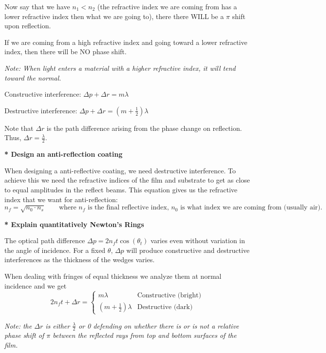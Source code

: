 \documentclass[10pt]{article}
\newcommand*{\lo}[1]{
    \textbf{* #1} \newline
}
\begin{document}
Now say that we have $n_1 < n_2$ (the refractive index we are coming from has a lower refractive index then what we are going to), there there WILL be a $\pi$ shift upon reflection.

\newblock

If we are coming from a high refractive index and going toward a lower refractive index, then there will be NO phase shift.

\newblock

\textit{Note: When light enters a material with a higher refractive index, it will tend toward the normal.}

\newblock

Constructive interference: $\Delta p + \Delta r = m \lambda$

Destructive interference: $\Delta p + \Delta r = (m + \frac{1}{2})\lambda$

Note that $\Delta r$ is the path difference arising from the phase change on reflection. Thus, $\Delta r = \frac{\lambda}{2}$.

\newblock

\lo{Design an anti-reflection coating}

When designing a anti-reflective coating, we need destructive interference. To achieve this we need the refractive indices of the film and substrate to get as close to equal amplitudes in the reflect beams. This equation gives us the refractive index that we want for anti-reflection:
\[n_f = \sqrt{n_0 \cdot n_s} \qquad \text{where $n_f$ is the final reflective index, $n_0$ is what index we are coming from (usually air).}\]


\lo{Explain quantitatively Newton's Rings}

The optical path difference $\Delta p = 2n_ft\cos(\theta_t)$ varies even without variation in the angle of incidence. For a fixed $\theta$, $\Delta p$ will produce constructive and destructive interferences as the thickness of the wedges varies.

\newblock

When dealing with fringes of equal thickness we analyze them at normal incidence and we get 
\[2n_ft + \Delta r = \begin{cases}
    m\lambda & \text{Constructive (bright)} \\ 
    (m+\frac{1}{2})\lambda &  \text{Destructive (dark)}
\end{cases}\]

\textit{Note: the $\Delta r$ is either $\frac{\lambda}{2}$ or 0 defending on whether there is or is not a relative phase shift of $\pi$ between the reflected rays from top and bottom surfaces of the film.}
\end{document}
